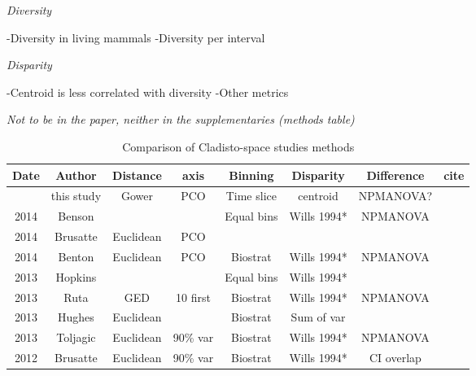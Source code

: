 \documentclass[12pt,letterpaper]{article}
\renewcommand{\subsection}[1]{%
\bigskip
\begin{center}
\begin{large}
\normalfont\itshape #1
\end{large}
\end{center}}
\begin{document}
\subsection{Diversity}
-Diversity in living mammals
-Diversity per interval

\subsection{Disparity}
-Centroid is less correlated with diversity
-Other metrics

\subsection{Not to be in the paper, neither in the supplementaries (methods table)}

\begin{table}[ht]
\caption{Comparison of Cladisto-space studies methods}
\centering
\begin{tabular}{cccccccc}
  \hline
    Date & Author      & Distance  & axis & Binning    & Disparity   & Difference & cite \\ %
  \hline
         & this study  & Gower     & PCO        & Time slice & centroid    & NPMANOVA?  & \\
    2014 & Benson      &           &            & Equal bins & Wills 1994* & NPMANOVA   & \citep{bensonfaunal2014} \\
    2014 & Brusatte    & Euclidean & PCO        &            &             &            & \citep{brusattegradual2014} \\
    2014 & Benton      & Euclidean & PCO        & Biostrat   & Wills 1994* & NPMANOVA   & \citep{bentonmodels2014} \\
    2013 & Hopkins     &           &            & Equal bins & Wills 1994* &            & \citep{hopkinsdecoupling2013} \\             
    2013 & Ruta        & GED       & 10 first   & Biostrat   & Wills 1994* & NPMANOVA   & \citep{ruta2013} \\
    2013 & Hughes      & Euclidean &            & Biostrat   & Sum of var  &            & \citep{Hughes20082013} \\
    2013 & Toljagic    & Euclidean & 90\% var   & Biostrat   & Wills 1994* & NPMANOVA   & \citep{toljagictriassic-jurassic2013} \\
    2012 & Brusatte    & Euclidean & 90\% var   & Biostrat   & Wills 1994* & CI overlap & \citep{brusattedinosaur2012} \\

\end{tabular}
\end{table}
\end{document}

